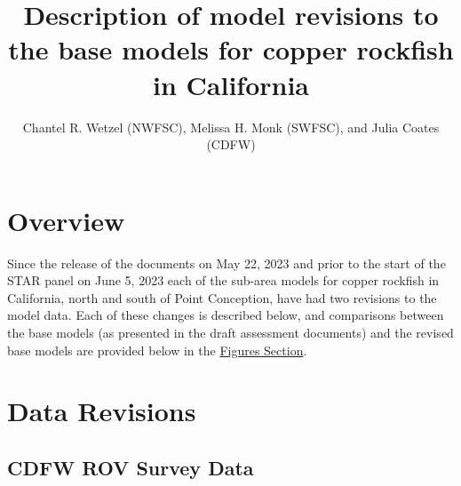 \documentclass[
  letterpaper,
]{article}
\title{Description of model revisions to the base models for copper rockfish in California}
\author{Chantel R. Wetzel (NWFSC), Melissa H. Monk (SWFSC), and Julia Coates (CDFW)}
\date{}
\begin{document}
\maketitle

{
\setcounter{tocdepth}{2}
\tableofcontents
}
\hypertarget{overview}{%
\section{Overview}\label{overview}}

Since the release of the documents on May 22, 2023 and prior to the start of the STAR panel on June 5, 2023 each of the sub-area models for copper rockfish in California, north and south of Point Conception, have had two revisions to the model data. Each of these changes is described below, and comparisons between the base models (as presented in the draft assessment documents) and the revised base models are provided below in the \protect\hyperlink{figures}{Figures Section}.

\hypertarget{data-revisions}{%
\section{Data Revisions}\label{data-revisions}}

\hypertarget{cdfw-rov-survey-data}{%
\subsection{CDFW ROV Survey Data}\label{cdfw-rov-survey-data}}
\end{document}
